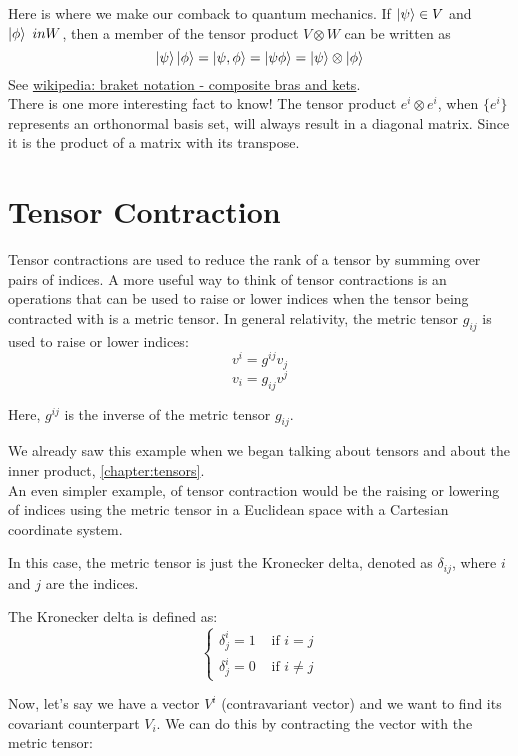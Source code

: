 Here is where we make our comback to quantum mechanics.
If $\ket{\psi} \in V$ and $\ket{\phi} \ in W$, then a member of the tensor product $V \otimes W$ can be written
as
$$
\ket{\psi}\ket{\phi} = \ket{\psi, \phi} = \ket{\psi\phi} = \ket{\psi} \otimes \ket{\phi}
$$
See
\href{https://en.wikipedia.org/wiki/Bra%E2%80%93ket_notation}{wikipedia: braket notation - composite bras and kets}.
\\

There is one more interesting fact to know!
The tensor product $e^i \otimes e^i$, when $\{e^i\}$ represents an orthonormal basis set,
will always result in a diagonal matrix.
Since it is the product of a matrix with its transpose.


\section{Tensor Contraction}


Tensor contractions are used to reduce the rank of a tensor by summing over pairs of indices.
A more useful way to think of tensor contractions is an operations that
can be used to raise or lower indices when the tensor being contracted with
is a metric tensor.
In general relativity, the metric tensor $g_{ij}$ is used to raise or lower indices:
$$
v^i = g^{ij} v_j
$$
$$
v_i = g_{ij} v^j
$$

Here, $g^{ij}$ is the inverse of the metric tensor $g_{ij}$.

We already saw this example when we began talking about tensors and about the inner product,
\ref{chapter:tensors}.
\\

An even simpler example, of tensor contraction would be the raising or lowering of indices using
the metric tensor in a Euclidean space with a Cartesian coordinate system.

In this case, the metric tensor is just the Kronecker delta, denoted as $\delta_{ij}$,
where $i$ and $j$ are the indices.

The Kronecker delta is defined as:
$$
\begin{cases}
    \delta^i_j = 1 & \text{ if } i = j \\
    \delta^i_j  = 0 & \text{ if } i \neq j
\end{cases}
$$

Now, let's say we have a vector $V^i$ (contravariant vector) and we want to find its
covariant counterpart $V_i$.
We can do this by contracting the vector with the metric tensor:

